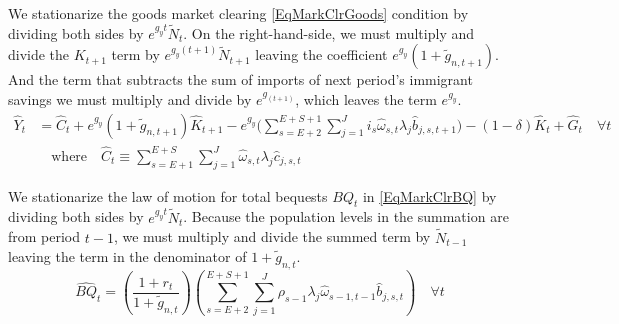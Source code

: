   We stationarize the goods market clearing \eqref{EqMarkClrGoods} condition by dividing both sides by $e^{g_y t}\tilde{N}_t$. On the right-hand-side, we must multiply and divide the $K_{t+1}$ term by $e^{g_y(t+1)}\tilde{N}_{t+1}$ leaving the coefficient $e^{g_y}(1+\tilde{g}_{n,t+1})$. And the term that subtracts the sum of imports of next period's immigrant savings we must multiply and divide by $e^{g_(t+1)}$, which leaves the term $e^{g_y}$.
  \begin{equation}\label{EqStnrzMarkClrGoods}
    \begin{split}
      \hat{Y}_t &= \hat{C}_t + e^{g_y}(1 + \tilde{g}_{n,t+1})\hat{K}_{t+1} - e^{g_y}\biggl(\sum_{s=E+2}^{E+S+1}\sum_{j=1}^{J}i_s\hat{\omega}_{s,t}\lambda_j \hat{b}_{j,s,t+1}\biggr) - (1-\delta)\hat{K}_t + \hat{G}_t \quad\forall t \\
      &\quad\text{where}\quad \hat{C}_t \equiv \sum_{s=E+1}^{E+S}\sum_{j=1}^{J}\hat{\omega}_{s,t}\lambda_j\hat{c}_{j,s,t}
    \end{split}
  \end{equation}

  We stationarize the law of motion for total bequests $BQ_t$ in \eqref{EqMarkClrBQ} by dividing both sides by $e^{g_y t}\tilde{N}_t$. Because the population levels in the summation are from period $t-1$, we must multiply and divide the summed term by $\tilde{N}_{t-1}$ leaving the term in the denominator of $1+\tilde{g}_{n,t}$.
  \begin{equation}\label{EqStnrzMarkClrBQ}
    \hat{BQ}_{t} = \left(\frac{1+r_{t}}{1 + \tilde{g}_{n,t}}\right)\left(\sum_{s=E+2}^{E+S+1}\sum_{j=1}^J\rho_{s-1}\lambda_j\hat{\omega}_{s-1,t-1}\hat{b}_{j,s,t}\right) \quad\forall t
  \end{equation}

